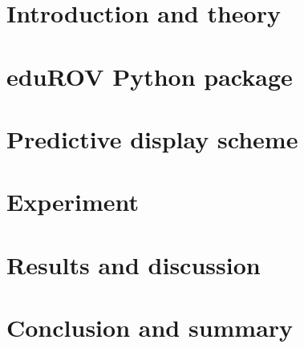 \documentclass[b5paper,10pt,twoside,openright]{book}
\begin{document}
\newpage\null\thispagestyle{empty}\newpage

\begingroup
\let\cleardoublepage\clearpage






\endgroup
 
{
\tableofcontents

{}
\listoffigures
\cleardoublepage

{}
\listoftables
\cleardoublepage
}
{

\chapter{Introduction and theory} \label{chpIntroduction}
		
	
\chapter{eduROV Python package}\label{chpEdurov}
		
	
\chapter{Predictive display scheme}\label{chpPredictive}
		

\chapter{Experiment}\label{chpMethod}
		

\chapter{Results and discussion}\label{chpResults}
	

\chapter{Conclusion and summary}\label{chpConc}
	

{
}
\printbibliography[title=References]

\begin{appendices}\label{appendix}


\end{appendices}}
\end{document}
